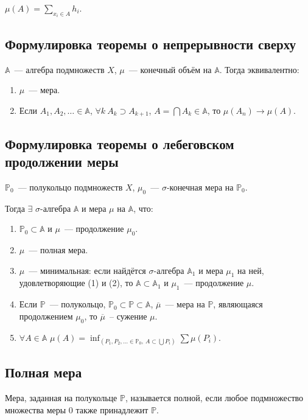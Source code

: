 \documentclass[paper=a4, fontsize=11pt]{article}
\begin{document}
$\mu(A) = \sum_{x_i \in A} h_i$.

\subsection{Формулировка теоремы о непрерывности сверху}
$\mathds{A}$~--- алгебра подмножеств $X$, $\mu$~--- конечный объём на $\mathds{A}$. Тогда эквивалентно:
\begin{enumerate}
    \item $\mu$~--- мера.
    \item Если $A_1,A_2,\dots \in \mathds{A}$, $\forall k\ A_k \supset A_{k+1}$, $A = \bigcap A_k \in \mathds{A}$,
    то $\mu(A_n) \to \mu(A)$.
\end{enumerate}

\subsection{Формулировка теоремы о лебеговском продолжении меры}
$\mathds{P}_0$~--- полукольцо подмножеств $X$, $\mu_0$~--- $\sigma$-конечная мера на $\mathds{P}_0$.

Тогда $\exists$ $\sigma$-алгебра $\mathds{A}$ и мера $\mu$ на $\mathds{A}$, что:
\begin{enumerate}
    \item $\mathds{P}_0 \subset \mathds{A}$ и $\mu$~--- продолжение $\mu_0$.
    \item $\mu$~--- полная мера.
    \item $\mu$~--- минимальная: если найдётся $\sigma$-алгебра $\mathds{A}_1$ и мера $\mu_1$ на ней, удовлетворяющие (1) и (2),
    то $\mathds{A} \subset \mathds{A}_1$ и $\mu_1$~--- продолжение $\mu$.
    \item Если $\mathds{P}$~--- полукольцо, $\mathds{P}_0 \subset \mathds{P} \subset \mathds{A}$, $\overline{\mu}$~---
    мера на $\mathds{P}$, являющаяся продолжением $\mu_0$, то $\overline{\mu}$~-- сужение $\mu$.
    \item $\forall A \in \mathds{A}$ $\mu(A) =
    \inf_{(P_1,P_2,\dots \in \mathds{P}_0,\ A \subset \bigcup P_i)} \sum \mu(P_i)$.
\end{enumerate}

\subsection{Полная мера}
Мера, заданная на полукольце $\mathds{P}$, называется полной, если любое подмножество множества меры $0$ также принадлежит $\mathds{P}$.
\end{document}
